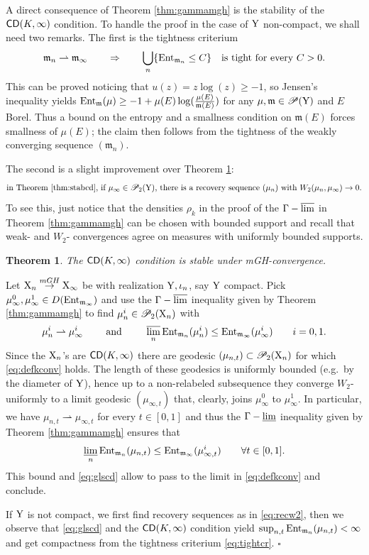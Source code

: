 \documentclass[11pt]{article}
\numberwithin{equation}{section}
\newtheorem{theorem}{Theorem}[section]
\newenvironment{idea}{\removelastskip\par\medskip   %
\noindent{\em Idea of the proof} \rm}{\penalty-20\null\hfill$\square$\par\medbreak}
\newcommand{\pr}{\mathscr P}
\newcommand{\prd}{\mathscr P_2}
\newcommand{\X}{{\rm X}}
\newcommand{\Y}{{\rm Y}}
\newcommand{\mm}{{\mathfrak m}}
\newcommand{\CD}{{\sf CD}}
\newcommand{\ent}{{\rm Ent}_\mm}
\newcommand{\entm}[1]{{\rm Ent}_{#1}}
\newcommand{\lims}{\varlimsup}
\newcommand{\limi}{\varliminf}
\newcommand{\weakto}{\rightharpoonup}
\DeclareMathOperator*{\glims}{\Gamma-\lims}
\begin{document}
A direct consequence of Theorem \ref{thm:gammamgh} is the stability of the $\CD(K,\infty)$ condition. To handle the proof in the case of $\Y$ non-compact, we shall need two remarks. The first is the tightness criterium
\begin{equation}
\label{eq:tightcr}
\mm_n\weakto\mm_\infty\qquad\Rightarrow\qquad  \bigcup_n\{\entm{\mm_n}\leq C\}\quad\text{is tight for every }C>0.
\end{equation}
This can be proved noticing that $u(z)=z\log(z)\geq-1$, so Jensen's inequality yields $\ent(\mu)\geq-1+\mu(E)\log(\tfrac{\mu(E)}{\mm(E)})$ for any $\mu,\mm\in\pr(\Y)$ and $E$ Borel. Thus a bound on the entropy and a smallness condition on $\mm(E)$ forces smallness of $\mu(E)$; the claim then follows from the tightness of the weakly converging sequence $(\mm_n)$.

The second is a slight improvement over Theorem \ref{thm:stabcd}:
\begin{equation}
\label{eq:recw2}
\text{in Theorem \ref{thm:stabcd}, if $\mu_\infty\in\pr_2(\Y)$, there is a recovery sequence $(\mu_n)$  with $W_2(\mu_n,\mu_\infty)\to0$.}
\end{equation}
To see this, just notice that  the densities $\rho_k$  in the proof of the $\glims$ in  Theorem \ref{thm:gammamgh} can be chosen with bounded support and recall that weak- and $W_2$- convergences agree on measures with uniformly bounded supports.
\begin{theorem}\label{thm:stabcd}
The $\CD(K,\infty)$ condition is stable under mGH-convergence.
\end{theorem}
\begin{idea} Let $\X_n\stackrel{mGH}\to \X_\infty$ be with realization $\Y,\iota_n$, say $\Y$ compact. Pick $\mu^0_\infty,\mu^1_\infty\in D(\entm{\mm_\infty})$ and use the $\Gamma-\lims$ inequality given by Theorem \ref{thm:gammamgh} to find $\mu^i_n\in\prd{(\X_n)}$ with
\begin{equation}
\label{eq:glscd}
\mu^i_n\weakto\mu^i_\infty\qquad\text{ and }\qquad\lims_n\entm{\mm_n}(\mu^i_n)\leq\entm{\mm_\infty}(\mu^i_{\infty})\qquad i=0,1.
\end{equation}
Since the $\X_n$'s are $\CD(K,\infty)$ there are geodesic $(\mu_{n,t})\subset\prd(\X_n)$ for which \eqref{eq:defkconv} holds. The length of these geodesics is uniformly bounded (e.g.\ by the diameter of $\Y$), hence up to a non-relabeled subsequence they converge $W_2$-uniformly to a limit geodesic $(\mu_{\infty,t})$ that, clearly, joins $\mu^0_\infty$ to $\mu^1_\infty$. In particular, we have $\mu_{n,t}\weakto\mu_{\infty,t}$ for every $t\in[0,1]$ and thus the $\Gamma-\limi$ inequality given by Theorem \ref{thm:gammamgh} ensures that
\[
\limi_n\entm{\mm_n}(\mu_{n,t})\leq\entm{\mm_\infty}(\mu^i_{\infty,t})\qquad\forall t\in[0,1].
\]
This bound and \eqref{eq:glscd} allow to pass to the limit in \eqref{eq:defkconv} and conclude.

 If $\Y$ is not compact, we first find recovery sequences as in \eqref{eq:recw2}, then we observe that \eqref{eq:glscd} and the $\CD(K,\infty)$ condition yield $\sup_{n,t}\entm{\mm_n}(\mu_{n,t})<\infty$ and get compactness from  the tightness criterium \eqref{eq:tightcr}.
\end{idea}
\end{document}
